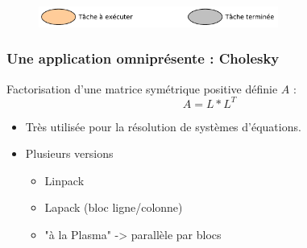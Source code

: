 \documentclass[xcolor={usenames,dvipsnames,svgnames,table}, aspectratio=43]{beamer}
\begin{document}
\begin{frame}
\begin{figure}
{    }%
  \end{figure}
  \begin{figure}
    \centering
    \includegraphics[width=0.7\textwidth]{graph/anim-peag/peage-analogie-legend.pdf}%
  \end{figure}
\end{frame}

\begin{frame}
\frametitle{Une application omniprésente : Cholesky}

Factorisation d'une matrice symétrique positive définie $A$ :
$$ A = L*L^T$$

\begin{itemize}
\item Très utilisée pour la résolution de systèmes d'équations.

\item Plusieurs versions

  \begin{itemize}
    \item Linpack
    \item Lapack (bloc ligne/colonne)
    \item "à la Plasma" -> parallèle par blocs
  \end{itemize}
\end{itemize}

\end{frame}
\end{document}
